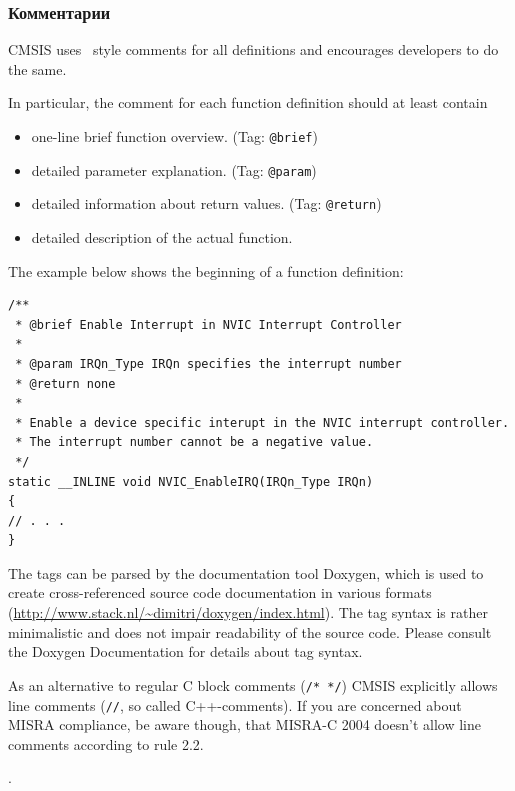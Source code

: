 \subsubsection{Комментарии}

CMSIS uses \ style comments for all definitions and encourages
developers to do the same.

In particular, the comment for each function definition should at least contain

\begin{itemize}
\item one-line brief function overview. (Tag: \verb|@brief|)
\item detailed parameter explanation. (Tag: \verb|@param|)
\item detailed information about return values. (Tag: \verb|@return|)
\item detailed description of the actual function.
\end{itemize}

The example below shows the beginning of a function definition:

\begin{lstlisting}[style=cpp]
/**
 * @brief Enable Interrupt in NVIC Interrupt Controller
 *
 * @param IRQn_Type IRQn specifies the interrupt number
 * @return none
 *
 * Enable a device specific interupt in the NVIC interrupt controller.
 * The interrupt number cannot be a negative value.
 */
static __INLINE void NVIC_EnableIRQ(IRQn_Type IRQn)
{
// . . .
}
\end{lstlisting}

The tags can be parsed by the documentation tool Doxygen, which is used to
create cross-referenced source code documentation in various formats
(\url{http://www.stack.nl/~dimitri/doxygen/index.html}). The tag syntax is
rather minimalistic and does not impair readability of the source code. Please
consult the Doxygen Documentation for details about tag syntax.

As an alternative to regular C block comments (\verb|/* */|) CMSIS explicitly
allows line comments (\verb|//|, so called C++-comments). If you are concerned
about MISRA compliance, be aware though, that MISRA-C 2004 doesn’t allow line
comments according to rule 2.2.

 .

